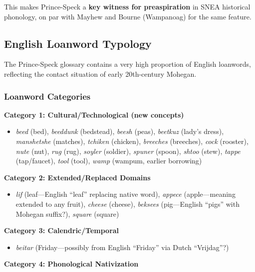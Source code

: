 This makes Prince-Speck a \textbf{key witness for preaspiration} in SNEA
historical phonology, on par with Mayhew and Bourne (Wampanoag) for the same
feature.

\subsection{English Loanword Typology}

The Prince-Speck glossary contains a very high proportion of English
loanwords, reflecting the contact situation of early 20th-century Mohegan.

\subsubsection{Loanword Categories}

\textbf{Category 1: Cultural/Technological (new concepts)}

\begin{itemize}
  \item \textit{beed} (bed), \textit{beeddunk} (bedstead), \textit{beesh}
    (peas), \textit{beetkuz} (lady's dress), \textit{manshetshe} (matches),
    \textit{tchiken} (chicken), \textit{breeches} (breeches), \textit{cock}
    (rooster), \textit{nute} (nut), \textit{rug} (rug), \textit{soyler}
    (soldier), \textit{spuner} (spoon), \textit{shtoo} (stew), \textit{tappe}
    (tap/faucet), \textit{tool} (tool), \textit{wamp} (wampum, earlier
    borrowing)
\end{itemize}

\textbf{Category 2: Extended/Replaced Domains}

\begin{itemize}
  \item \textit{lif} (leaf---English ``leaf'' replacing native word),
    \textit{appece} (apple---meaning extended to any fruit), \textit{cheese}
    (cheese), \textit{beksees} (pig---English ``pigs'' with Mohegan suffix?),
    \textit{square} (square)
\end{itemize}

\textbf{Category 3: Calendric/Temporal}

\begin{itemize}
  \item \textit{beitar} (Friday---possibly from English ``Friday'' via Dutch
    ``Vrijdag''?)
\end{itemize}

\textbf{Category 4: Phonological Nativization}

